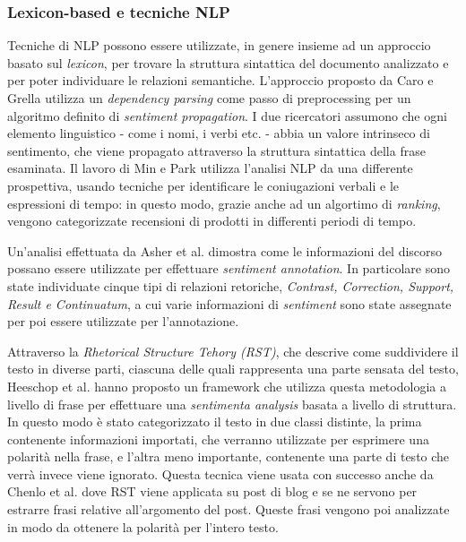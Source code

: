 \documentclass[a4paper,12pt,openright,twoside]{report}
\theoremstyle{definition}
\begin{document}
\subsubsection{Lexicon-based e tecniche NLP}
Tecniche di NLP possono essere utilizzate, in genere insieme ad un approccio basato sul \emph{lexicon}, per 
trovare la struttura sintattica del documento analizzato e per poter individuare le relazioni semantiche.
L'approccio proposto da Caro e Grella %
utilizza un \emph{dependency parsing} come passo di preprocessing per un algoritmo definito di \emph{sentiment propagation}.
I due ricercatori assumono che ogni elemento linguistico - come i nomi, i verbi etc. - abbia un valore intrinseco di
sentimento, che viene propagato attraverso la struttura sintattica della frase esaminata.
Il lavoro di Min e Park %
utilizza l'analisi NLP da una differente prospettiva, usando tecniche per identificare le coniugazioni
verbali e le espressioni di tempo: in questo modo, grazie anche ad un algortimo di \emph{ranking}, vengono categorizzate
recensioni di prodotti in differenti periodi di tempo.

Un'analisi effettuata da Asher et al. %
dimostra come le informazioni del discorso possano essere utilizzate per effettuare \emph{sentiment annotation}. In particolare
sono state individuate cinque tipi di relazioni retoriche, \emph{Contrast, Correction, Support, Result e Continuatum},
a cui varie informazioni di \emph{sentiment} sono state assegnate per poi essere utilizzate per l'annotazione.

Attraverso la \emph{Rhetorical Structure Tehory (RST)}, che descrive come suddividere il testo in diverse parti, ciascuna
delle quali rappresenta una parte sensata del testo, Heeschop et al. %
hanno proposto un framework che utilizza questa metodologia  a livello di frase per effettuare una \emph{sentimenta analysis}
basata a livello di struttura. In questo modo è stato categorizzato il testo in due classi distinte, la prima
contenente
informazioni importati, che verranno utilizzate per esprimere una polarità nella frase, e l'altra 
meno importante, contenente una parte di testo che verrà
invece viene ignorato.
Questa tecnica viene usata con successo anche da Chenlo et al. %
dove RST viene applicata su post di blog e se ne servono per estrarre frasi relative all'argomento del post. Queste frasi
vengono poi analizzate in modo da ottenere la polarità per l'intero testo.
\end{document}

